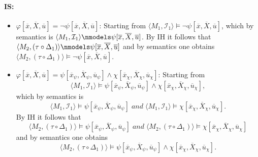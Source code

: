 \documentclass[11pt,a4paper]{article}
\newcommand{\sand}{\; and \;}
\begin{document}
\paragraph*{IS:}
\begin{itemize}[leftmargin=*]
\item $\varphi[\overline{x}, \overline{X}, \overline{u}] = \neg  \psi[\overline{x}, \overline{X}, \overline{u}]$: Starting from $\langle M_1, \mathcal{I}_1 \rangle \models \neg  \psi[\overline{x}, \overline{X}, \overline{u}]$, which by semantics is $\langle M_1, \mathcal{I}_1 \rangle \nmodels \psi[\overline{x}, \overline{X}, \overline{u}]$. By IH it follows that $\langle M_2, (\tau \circ \Delta_1) \rangle \nmodels \psi[\overline{x}, \overline{X}, \overline{u}]$ and by semantics one obtains $\langle M_2, (\tau \circ \Delta_1) \rangle \models \neg \psi[\overline{x}, \overline{X}, \overline{u}]$.\\


\item $\varphi[\overline{x}, \overline{X}, \overline{u}] = \psi[\overline{x}_{\psi}, \overline{X}_{\psi}, \overline{u}_{\psi}] \land \chi[\overline{x}_{\chi}, \overline{X}_{\chi}, \overline{u}_{\chi}]$:
Starting from 
\begin{equation*}
\langle M_1, \mathcal{I}_1 \rangle \models \psi[\overline{x}_{\psi}, \overline{X}_{\psi}, \overline{u}_{\psi}] \land \chi[\overline{x}_{\chi}, \overline{X}_{\chi}, \overline{u}_{\chi}],
\end{equation*}
which by semantics is 
\begin{equation*}
\langle M_1, \mathcal{I}_1 \rangle \models \psi[\overline{x}_{\psi}, \overline{X}_{\psi}, \overline{u}_{\psi}] \sand \langle M_1, \mathcal{I}_1 \rangle \models \chi[\overline{x}_{\chi}, \overline{X}_{\chi}, \overline{u}_{\chi}].
\end{equation*}
By IH it follows that  
\begin{equation*}
\langle M_2, (\tau \circ \Delta_1) \rangle \models \psi[\overline{x}_{\psi}, \overline{X}_{\psi}, \overline{u}_{\psi}] \sand\langle M_2, (\tau \circ \Delta_1) \rangle \models \chi[\overline{x}_{\chi}, \overline{X}_{\chi}, \overline{u}_{\chi}]
\end{equation*}
and by semantics one obtains 
\begin{equation*}
\langle M_2, (\tau \circ \Delta_1) \rangle \models \psi[\overline{x}_{\psi}, \overline{X}_{\psi}, \overline{u}_{\psi}] \land \chi[\overline{x}_{\chi}, \overline{X}_{\chi}, \overline{u}_{\chi}].
\end{equation*}\\
 


\end{itemize}
\end{document}

